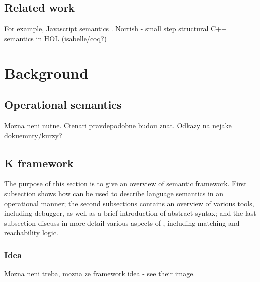 \documentclass{fithesis3}
\begin{document}
\section{Related work}
For example, Javascript semantics \cite{park-stefanescu-rosu-2015-pldi}.
Norrish - small step structural C++ semantics in HOL (isabelle/coq?)


\chapter{Background}

\section{Operational semantics}
Mozna neni nutne. Ctenari pravdepodobne budou znat. Odkazy na nejake dokuemnty/kurzy?


\section{K framework}

The purpose of this section is to give an overview of \K semantic framework. First subsection shows how \K can be used to describe language semantics in an operational manner; the second subsections contains an overview of various \K tools, including debugger, as well as a brief introduction of \K abstract syntax; and the last subsection discuss in more detail various aspects of \K, including matching and reachability logic.

\subsection{Idea}
Mozna neni treba, mozna ze 
\K framework idea - see their image.



% 

\end{document}

